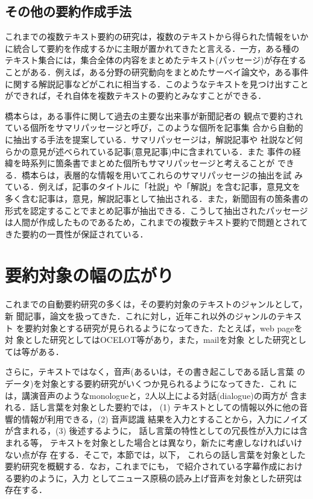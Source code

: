 \subsection*{その他の要約作成手法}

これまでの複数テキスト要約の研究は，複数のテキストから得られた情報をいか
に統合して要約を作成するかに主眼が置かれてきたと言える．一方，ある種の
テキスト集合には，集合全体の内容をまとめたテキスト(パッセージ)が存在する
ことがある．例えば，ある分野の研究動向をまとめたサーベイ論文や，ある事件
に関する解説記事などがこれに相当する．このようなテキストを見つけ出すこと
ができれば，それ自体を複数テキストの要約とみなすことができる．

橋本ら\cite{hashimoto:01:a}は，ある事件に関して過去の主要な出来事が新聞記者の
観点で要約されている個所をサマリパッセージと呼び，このような個所を記事集
合から自動的に抽出する手法を提案している．サマリパッセージは，解説記事や
社説など何らかの意見が述べられている記事(意見記事)中に含まれている．また
事件の経緯を時系列に箇条書でまとめた個所もサマリパッセージと考えることが
できる．橋本らは，表層的な情報を用いてこれらのサマリパッセージの抽出を試
みている．例えば，記事のタイトルに「社説」や「解説」を含む記事，意見文を
多く含む記事は，意見，解説記事として抽出される．また，新聞固有の箇条書の
形式を認定することでまとめ記事が抽出できる．こうして抽出されたパッセージ
は人間が作成したものであるため，これまでの複数テキスト要約で問題とされて
きた要約の一貫性が保証されている．

\section{要約対象の幅の広がり}

これまでの自動要約研究の多くは，その要約対象のテキストのジャンルとして，新
聞記事，論文を扱ってきた．これに対し，近年これ以外のジャンルのテキスト
を要約対象とする研究が見られるようになってきた．たとえば，web pageを対
象とした研究としてはOCELOT\cite{berger:00:a}等があり，また，mailを対象
とした研究としては\cite{toyama:00:a}等がある．

さらに，テキストではなく，音声(あるいは，その書き起こしである話し言葉
のデータ)を対象とする要約研究がいくつか見られるようになってきた．これ
には，講演音声のようなmonologueと，2人以上による対話(dialogue)の両方が
含まれる．話し言葉を対象とした要約では，
(1) テキストとしての情報以外に他の音響的情報が利用できる，(2) 音声認識
結果を入力とすることから，入力にノイズが含まれる，(3) 後述するように，
話し言葉の特性としての冗長性が入力には含まれる等，
テキストを対象とした場合とは異なり，新たに考慮しなければいけない点が存
在する．そこで，本節では，以下，
これらの話し言葉を対象とした要約研究を概観する．なお，これまでにも，
\cite{okumura:99:a}で紹介されている字幕作成における要約のように，入力
としてニュース原稿の読み上げ音声を対象とした研究は存在する．

